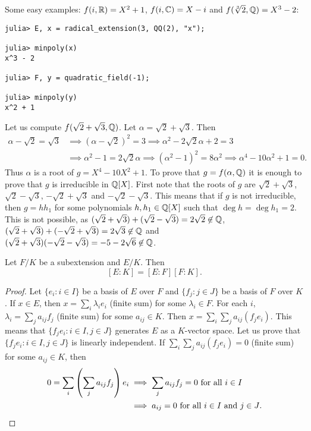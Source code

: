 Some easy examples: $f(i,\mathbb{R})=X^2+1$, 
$f(i,\mathbb{C})=X-i$ and 
$f(\sqrt[3]{2},\mathbb{Q})=X^3-2$:
\begin{lstlisting}
julia> E, x = radical_extension(3, QQ(2), "x");

julia> minpoly(x)
x^3 - 2

julia> F, y = quadratic_field(-1);

julia> minpoly(y)
x^2 + 1
\end{lstlisting}

\begin{example}
	Let us compute 
	$f(\sqrt{2}+\sqrt{3},\mathbb{Q})$. Let $\alpha=\sqrt{2}+\sqrt{3}$. 
	Then 
	\begin{align*}
		\alpha-\sqrt{2}=\sqrt{3} & \implies 
		(\alpha-\sqrt{2})^2=3 \implies \alpha^2-2\sqrt{2}\alpha+2=3\\
		&\implies \alpha^2-1=2\sqrt{2}\alpha \implies
		(\alpha^2-1)^2=8\alpha^2\implies
		\alpha^4-10\alpha^2+1=0.
	\end{align*}
	Thus $\alpha$ is a root of $g=X^4-10X^2+1$. To prove that $g=f(\alpha,\mathbb{Q})$ 
	it is enough to prove that 
	$g$ is irreducible in $\mathbb{Q}[X]$. First note that 
	the roots
	of $g$ are $\sqrt{2}+\sqrt{3}$, $\sqrt{2}-\sqrt{3}$, 
	$-\sqrt{2}+\sqrt{3}$ and $-\sqrt{2}-\sqrt{3}$. This means that
	if $g$ is not irreducible, 
	then $g=hh_1$ for some polynomials $h,h_1\in\mathbb{Q}[X]$ such that
	$\deg h=\deg h_1=2$. This is not possible, as 
	$(\sqrt{2}+\sqrt{3})+(\sqrt{2}-\sqrt{3})=2\sqrt{2}\not\in\mathbb{Q}$, 
	$(\sqrt{2}+\sqrt{3})+(-\sqrt{2}+\sqrt{3})=2\sqrt{3}\not\in\mathbb{Q}$ and 
	$(\sqrt{2}+\sqrt{3})(-\sqrt{2}-\sqrt{3})=-5-2\sqrt{6}\not\in\mathbb{Q}$.
\end{example}


\begin{proposition}
\label{pro:multiplicativity of degree}
	Let $F/K$ be a subextension and $E/K$. Then
	\[
	[E:K]=[E:F][F:K].
	\]
\end{proposition}

\begin{proof}
	Let $\{e_i:i\in I\}$ be a basis of $E$ over $F$
	and $\{f_j:j\in J\}$ be a basis of $F$ over $K$. If $x\in E$,
	then $x=\sum_i \lambda_ie_i$ (finite sum) 
	for some $\lambda_i\in F$. For each $i$, 
	$\lambda_i=\sum_j a_{ij}f_j$ (finite sum)
	for some $a_{ij}\in K$. Then 
	$x=\sum_i\sum_j a_{ij}(f_je_i)$. This means
	that $\{f_je_i:i\in I,j\in J\}$ generates
	$E$ as a $K$-vector space. Let us prove that 
	$\{f_je_i:i\in I,j\in J\}$
	is linearly independent. If $\sum_i\sum_j a_{ij}(f_je_i)=0$ (finite sum)
	for some $a_{ij}\in K$, 
	then
	\begin{align*}
		0=\sum_i\left(\sum_j a_{ij}f_j\right)e_i&\implies
		\sum_j a_{ij}f_j=0\text{ for all $i\in I$}\\
		&\implies 
		a_{ij}=0\text{ for all $i\in I$ and $j\in J$}.\qedhere
	\end{align*}
\end{proof}

